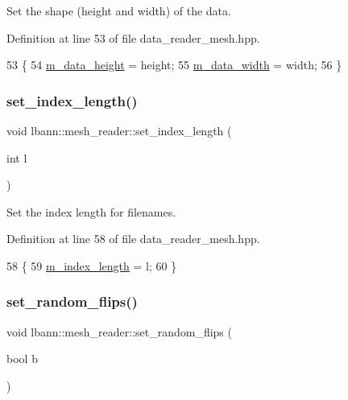 Set the shape (height and width) of the data. 



Definition at line 53 of file data\+\_\+reader\+\_\+mesh.\+hpp.


\begin{DoxyCode}
53                                              \{
54     \hyperlink{classlbann_1_1mesh__reader_aeb4e0df4e0be56244df5b663e2940d11}{m\_data\_height} = height;
55     \hyperlink{classlbann_1_1mesh__reader_a8e16a565b0afd3097a0b6fe31a94641e}{m\_data\_width} = width;
56   \}
\end{DoxyCode}
\mbox{\label{classlbann_1_1mesh__reader_a06970dacd445a325059033d47b24694e}} 
\subsubsection{\texorpdfstring{set\+\_\+index\+\_\+length()}{set\_index\_length()}}
{\footnotesize\ttfamily void lbann\+::mesh\+\_\+reader\+::set\+\_\+index\+\_\+length (\begin{DoxyParamCaption}\item[{int}]{l }\end{DoxyParamCaption})\hspace{0.3cm}{\ttfamily [inline]}}



Set the index length for filenames. 



Definition at line 58 of file data\+\_\+reader\+\_\+mesh.\+hpp.


\begin{DoxyCode}
58                                \{
59     \hyperlink{classlbann_1_1mesh__reader_a43c1aec4b0f635f6f7bf52944ace1883}{m\_index\_length} = l;
60   \}
\end{DoxyCode}
\mbox{\label{classlbann_1_1mesh__reader_a48eedb0d62f445c8ba6d07d2f22da722}} 
\subsubsection{\texorpdfstring{set\+\_\+random\+\_\+flips()}{set\_random\_flips()}}
{\footnotesize\ttfamily void lbann\+::mesh\+\_\+reader\+::set\+\_\+random\+\_\+flips (\begin{DoxyParamCaption}\item[{bool}]{b }\end{DoxyParamCaption})\hspace{0.3cm}{\ttfamily [inline]}}



